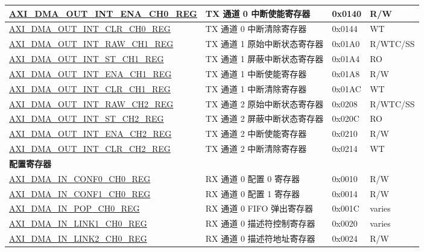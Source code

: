 \begin{longtable}{ | l | l | p{1.3cm} | l | }
\hyperref[regdesc:AXIDMAOUTINTENACHNREG]{AXI\_DMA\_OUT\_INT\_ENA\_CH0\_REG} & TX 通道 0 中断使能寄存器 & 0x0140 & R/W \\ \hline
\hyperref[regdesc:AXIDMAOUTINTCLRCHNREG]{AXI\_DMA\_OUT\_INT\_CLR\_CH0\_REG} & TX 通道 0 中断清除寄存器  & 0x0144 & WT \\ \hline
\hyperref[regdesc:AXIDMAOUTINTRAWCHNREG]{AXI\_DMA\_OUT\_INT\_RAW\_CH1\_REG} & TX 通道 1 原始中断状态寄存器 & 0x01A0 & R/WTC/SS \\ \hline
\hyperref[regdesc:AXIDMAOUTINTSTCHNREG]{AXI\_DMA\_OUT\_INT\_ST\_CH1\_REG} & TX 通道 1 屏蔽中断状态寄存器 & 0x01A4 & RO \\ \hline
\hyperref[regdesc:AXIDMAOUTINTENACHNREG]{AXI\_DMA\_OUT\_INT\_ENA\_CH1\_REG} & TX 通道 1 中断使能寄存器 & 0x01A8 & R/W \\ \hline
\hyperref[regdesc:AXIDMAOUTINTCLRCHNREG]{AXI\_DMA\_OUT\_INT\_CLR\_CH1\_REG} & TX 通道 1 中断清除寄存器  & 0x01AC & WT \\ \hline
\hyperref[regdesc:AXIDMAOUTINTRAWCHNREG]{AXI\_DMA\_OUT\_INT\_RAW\_CH2\_REG} & TX 通道 2 原始中断状态寄存器 & 0x0208 & R/WTC/SS \\ \hline
\hyperref[regdesc:AXIDMAOUTINTSTCHNREG]{AXI\_DMA\_OUT\_INT\_ST\_CH2\_REG} & TX 通道 2 屏蔽中断状态寄存器 & 0x020C & RO \\ \hline
\hyperref[regdesc:AXIDMAOUTINTENACHNREG]{AXI\_DMA\_OUT\_INT\_ENA\_CH2\_REG} & TX 通道 2 中断使能寄存器 & 0x0210 & R/W \\ \hline
\hyperref[regdesc:AXIDMAOUTINTCLRCHNREG]{AXI\_DMA\_OUT\_INT\_CLR\_CH2\_REG} & TX 通道 2 中断清除寄存器  & 0x0214 & WT \\ \hline
\multicolumn{4}{|l|}{\textbf{配置寄存器}} \\ \hline
\hyperref[regdesc:AXIDMAINCONF0CHNREG]{AXI\_DMA\_IN\_CONF0\_CH0\_REG} & RX 通道 0 配置 0 寄存器 & 0x0010 & R/W \\ \hline
\hyperref[regdesc:AXIDMAINCONF1CHNREG]{AXI\_DMA\_IN\_CONF1\_CH0\_REG} & RX 通道 0 配置 1 寄存器 & 0x0014 & R/W \\ \hline
\hyperref[regdesc:AXIDMAINPOPCHNREG]{AXI\_DMA\_IN\_POP\_CH0\_REG} & RX 通道 0 FIFO 弹出寄存器 & 0x001C & varies \\ \hline
\hyperref[regdesc:AXIDMAINLINK1CHNREG]{AXI\_DMA\_IN\_LINK1\_CH0\_REG} & RX 通道 0 描述符控制寄存器 & 0x0020 & varies \\ \hline
\hyperref[regdesc:AXIDMAINLINK2CHNREG]{AXI\_DMA\_IN\_LINK2\_CH0\_REG} & RX 通道 0 描述符地址寄存器 & 0x0024 & R/W \\ \hline

\end{longtable}
